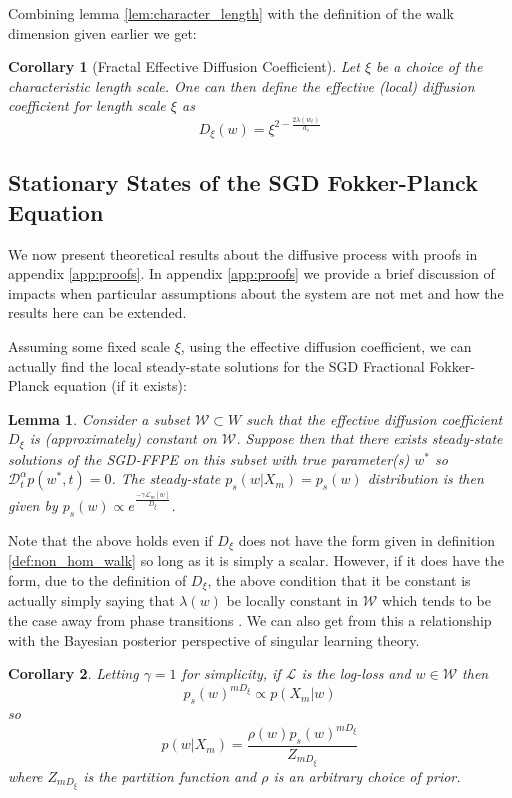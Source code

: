 \documentclass{article} %
\newtheorem{lemma}{Lemma}[section]
\newtheorem{corollary}{Corollary}[section]
\theoremstyle{definition}
\begin{document}
Combining lemma \ref{lem:character_length} with the definition of the walk dimension given earlier we get:
\begin{corollary}[Fractal Effective Diffusion Coefficient]\label{def:effect_diff}
Let $\xi$ be a choice of the characteristic length scale. One can then define the effective (local) diffusion coefficient for length scale $\xi$ as
\begin{equation}
    D_\xi(w) = \xi^{2-\frac{2\lambda(w_t)}{d_s}}
\end{equation}
\end{corollary}



\subsection{Stationary States of the SGD Fokker-Planck Equation}
We now present theoretical results about the diffusive process with proofs in appendix \ref{app:proofs}. In appendix \ref{app:proofs} we provide a brief discussion of impacts when particular assumptions about the system are not met and how the results here can be extended.

Assuming some fixed scale $\xi$, using the effective diffusion coefficient, we can actually find the local steady-state solutions for the SGD Fractional Fokker-Planck equation (if it exists):
\begin{lemma}\label{res:stat_state}
Consider a subset $\mathcal{W} \subset W$ such that the effective diffusion coefficient $D_\xi$ is (approximately) constant on $\mathcal{W}$. Suppose then that there exists steady-state solutions of the SGD-FFPE on this subset with true parameter(s) $w^*$ so $\mathcal{D}^\alpha_t p(w^*,t) = 0$. The steady-state $p_{s}(w|X_m) = p_{s}(w)$ distribution is then given by $p_{s}(w) \propto e^{\frac{-\gamma\mathcal{L}_m[w]}{D_\xi}}$.
\end{lemma}

Note that the above holds even if $D_\xi$ does not have the form given in definition \ref{def:non_hom_walk} so long as it is simply a scalar. However, if it does have the form, due to the definition of $D_\xi$, the above condition that it be constant is actually simply saying that $\lambda(w)$ be locally constant in $\mathcal{W}$ which tends to be the case away from phase transitions \citep{wang2025differentiation}. We can also get from this a relationship with the Bayesian posterior perspective of singular learning theory.

\begin{corollary}\label{cor:steady_state_dist}
Letting $\gamma = 1$ for simplicity, if $\mathcal{L}$ is the log-loss and $w \in \mathcal{W}$ then 
\begin{equation}
    p_{s}(w)^{mD_\xi} \propto p(X_m|w)
\end{equation}
so
\begin{equation}
    p(w|X_m) = \frac{\rho(w)p_{s}(w)^{mD_\xi} }{Z_{mD_\xi}}
\end{equation}
where $Z_{mD_\xi}$ is the partition function and $\rho$ is an arbitrary choice of prior.
\end{corollary}
\end{document}
